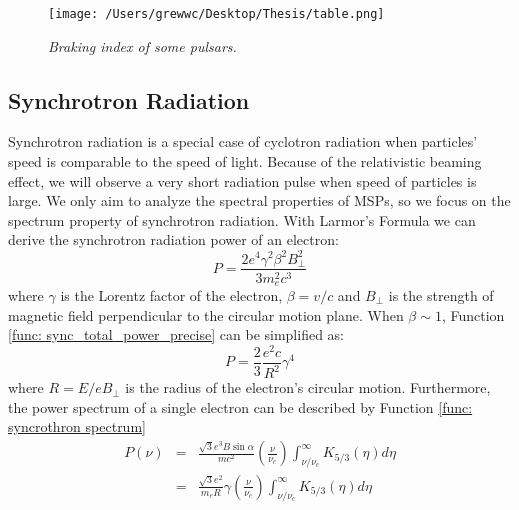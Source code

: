 \documentclass[12pt]{report}
\newcommand{\mycaption}[1]{\caption{\textit{\footnotesize #1}}}
\begin{document}
            
            \begin{figure}[!ht]
              \centering
              \texttt{[image: /Users/grewwc/Desktop/Thesis/table.png]}
              \mycaption{Braking index of some pulsars.}
              \label{fig:braking_index}
            \end{figure}
    
          \subsection{Synchrotron Radiation}
            Synchrotron radiation is a special case of cyclotron radiation when particles' speed is comparable to the 
            speed of light. Because of the relativistic beaming effect, we will observe a very short radiation pulse 
            when speed of particles is large. 
            We only aim to analyze the spectral properties of MSPs, so we focus on the 
            spectrum property of synchrotron radiation. 
            With Larmor's Formula we can derive the synchrotron radiation power of an electron:
            \begin{equation}
              \label{func: sync_total_power_precise}
              P = \frac{2e^4\gamma^2\beta^2B_{\perp}^2}{3m_e^2c^3} 
            \end{equation}
            where $\gamma$ is the Lorentz factor of the electron, $\beta=v/c$ and $B_{\perp}$ is the strength 
            of magnetic field perpendicular to the circular motion plane. 
            When $\beta \sim 1$, Function \ref{func: sync_total_power_precise} can be simplified as:
            \begin{equation}
              \label{func: sync_total_power_simplified}
              P = \frac{2}{3}\frac{e^2c}{R^2}\gamma^4
            \end{equation}
            where $R = E / e B_{\perp}$ is the radius of the electron's circular motion. 
            Furthermore, the power spectrum of a single electron  
            can be described by Function \ref{func: syncrothron spectrum}
            \begin{eqnarray}
              \label{func: syncrothron spectrum}
              P\left(\nu\right) &=& \frac{\sqrt{3} e^3 B \sin{\alpha}}{m c^2} 
                \left(\frac{\nu}{\nu_c}\right) \int_{\nu / \nu_c}^{\infty} K_{5/3}\left(\eta \right)d\eta  \nonumber \\
                &=& \frac{\sqrt{3}e^2}{m_eR}\gamma \left(\frac{\nu}{\nu_c}\right) \int_{\nu / \nu_c}^{\infty} K_{5/3}\left(\eta \right)d\eta
            \end{eqnarray}
\end{document}
